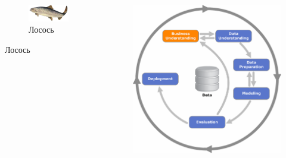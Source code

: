 \documentclass[10pt]{beamer}
\begin{document}
\begin{frame}{}
\begin{columns}[C]
\begin{column}{.5\textwidth}
\begin{figure}
        \begin{subfigure}[b]{\textwidth}
                \includegraphics[width=0.9\textwidth]{images/salmon.jpg}
                \caption{Лосось}     
        \end{subfigure}
	\end{figure}    
    \end{column}
    \begin{column}{.5\textwidth}
    \vspace{-0em}
	\begin{center}
   		\includegraphics[width=\textwidth]{images/crisp-bu.png}
    \end{center}
    \end{column}
  \end{columns}

\end{frame}
\end{document}
